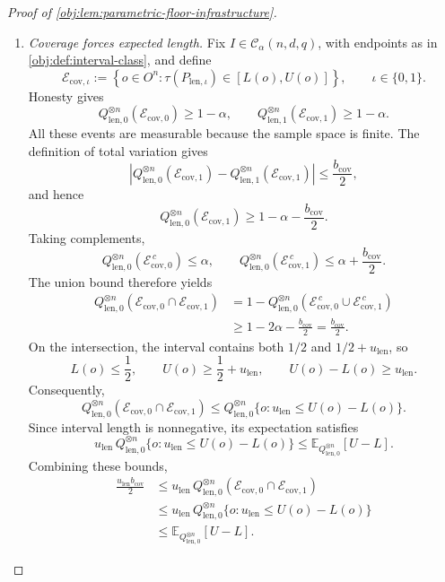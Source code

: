 \documentclass[11pt]{article}
\begin{document}
\begin{proof}[Proof of \cref{obj:lem:parametric-floor-infrastructure}]
\begin{enumerate}
\item \emph{Coverage forces expected length.}
Fix \(I\in\mathcal C_\alpha(n,d,q)\), with endpoints as in \cref{obj:def:interval-class}, and define
\[
\mathcal E_{\mathrm{cov},\iota}
:=
\left\{
o\in O^n:
\tau(P_{\mathrm{len},\iota})\in[L(o),U(o)]
\right\},
\qquad \iota\in\{0,1\}.
\]
Honesty gives
\[
Q_{\mathrm{len},0}^{\otimes n}(\mathcal E_{\mathrm{cov},0})
\ge1-\alpha,
\qquad
Q_{\mathrm{len},1}^{\otimes n}(\mathcal E_{\mathrm{cov},1})
\ge1-\alpha.
\]
All these events are measurable because the sample space is finite. The definition of total variation gives
\[
\left|
Q_{\mathrm{len},0}^{\otimes n}(\mathcal E_{\mathrm{cov},1})
-
Q_{\mathrm{len},1}^{\otimes n}(\mathcal E_{\mathrm{cov},1})
\right|
\le\frac{b_{\mathrm{cov}}}{2},
\]
and hence
\[
Q_{\mathrm{len},0}^{\otimes n}(\mathcal E_{\mathrm{cov},1})
\ge1-\alpha-\frac{b_{\mathrm{cov}}}{2}.
\]
Taking complements,
\[
Q_{\mathrm{len},0}^{\otimes n}(\mathcal E_{\mathrm{cov},0}^{\,c})
\le\alpha,
\qquad
Q_{\mathrm{len},0}^{\otimes n}(\mathcal E_{\mathrm{cov},1}^{\,c})
\le\alpha+\frac{b_{\mathrm{cov}}}{2}.
\]
The union bound therefore yields
\[
\begin{aligned}
Q_{\mathrm{len},0}^{\otimes n}
 (\mathcal E_{\mathrm{cov},0}\cap\mathcal E_{\mathrm{cov},1})
&=
1-
Q_{\mathrm{len},0}^{\otimes n}
 (\mathcal E_{\mathrm{cov},0}^{\,c}
  \cup\mathcal E_{\mathrm{cov},1}^{\,c})\\
&\ge1-2\alpha-\frac{b_{\mathrm{cov}}}{2}
=\frac{b_{\mathrm{cov}}}{2}.
\end{aligned}
\]
On the intersection, the interval contains both \(1/2\) and \(1/2+u_{\mathrm{len}}\), so
\[
L(o)\le\frac12,
\qquad
U(o)\ge\frac12+u_{\mathrm{len}},
\qquad
U(o)-L(o)\ge u_{\mathrm{len}}.
\]
Consequently,
\[
Q_{\mathrm{len},0}^{\otimes n}
 (\mathcal E_{\mathrm{cov},0}\cap\mathcal E_{\mathrm{cov},1})
\le
Q_{\mathrm{len},0}^{\otimes n}
 \{o:u_{\mathrm{len}}\le U(o)-L(o)\}.
\]
Since interval length is nonnegative, its expectation satisfies
\[
u_{\mathrm{len}}\,
Q_{\mathrm{len},0}^{\otimes n}
 \{o:u_{\mathrm{len}}\le U(o)-L(o)\}
\le
\mathbb E_{Q_{\mathrm{len},0}^{\otimes n}}[U-L].
\]
Combining these bounds,
\[
\begin{aligned}
\frac{u_{\mathrm{len}}b_{\mathrm{cov}}}{2}
&\le
u_{\mathrm{len}}\,
Q_{\mathrm{len},0}^{\otimes n}
 (\mathcal E_{\mathrm{cov},0}\cap\mathcal E_{\mathrm{cov},1})\\
&\le
u_{\mathrm{len}}\,
Q_{\mathrm{len},0}^{\otimes n}
 \{o:u_{\mathrm{len}}\le U(o)-L(o)\}\\
&\le
\mathbb E_{Q_{\mathrm{len},0}^{\otimes n}}[U-L].
\end{aligned}
\]


\end{enumerate}
\end{proof}
\end{document}
